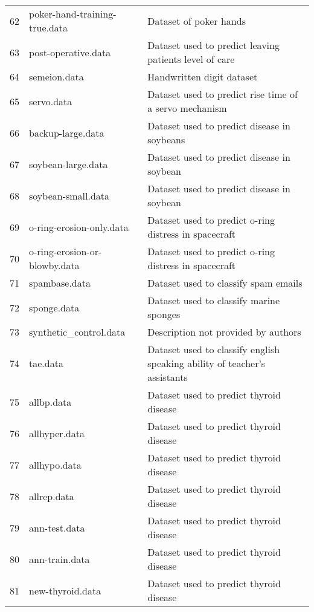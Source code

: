 \begin{table}
{\begin{tabular}{|l|l|l|}
62 &            poker-hand-training-true.data & Dataset of poker hands\\
63 &                      post-operative.data & Dataset used to predict leaving patients level of care\\
64 &                             semeion.data & Handwritten digit dataset\\
65 &                               servo.data & Dataset used to predict rise time of a servo mechanism\\
66 &                        backup-large.data & Dataset used to predict disease in soybeans\\
67 &                       soybean-large.data & Dataset used to predict disease in soybean\\
68 &                       soybean-small.data & Dataset used to predict disease in soybean\\
69 &                 o-ring-erosion-only.data & Dataset used to predict o-ring distress in spacecraft\\
70 &            o-ring-erosion-or-blowby.data & Dataset used to predict o-ring distress in spacecraft\\
71 &                            spambase.data & Dataset used to classify spam emails\\
72 &                              sponge.data & Dataset used to classify marine sponges\\
73 &                   synthetic\_control.data & Description not provided by authors\\
74 &                                 tae.data & Dataset used to classify english speaking ability of teacher's assistants\\
75 &                               allbp.data & Dataset used to predict thyroid disease\\
76 &                            allhyper.data & Dataset used to predict thyroid disease\\
77 &                             allhypo.data & Dataset used to predict thyroid disease\\
78 &                              allrep.data & Dataset used to predict thyroid disease\\
79 &                            ann-test.data & Dataset used to predict thyroid disease\\
80 &                           ann-train.data & Dataset used to predict thyroid disease\\
81 &                         new-thyroid.data & Dataset used to predict thyroid disease\\

\end{tabular}}
\end{table}
